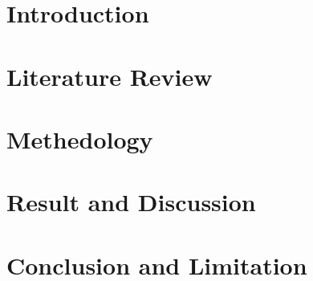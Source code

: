 \chapter{Introduction}
\label{introChapter}


\chapter{Literature Review}
\label{literatureReviewChapter}


\chapter{Methedology}
\label{methodologyChapter}


\chapter{Result and Discussion}
\label{resultChapter}


\chapter{Conclusion and Limitation}
\label{conclusionChapter}


% 
